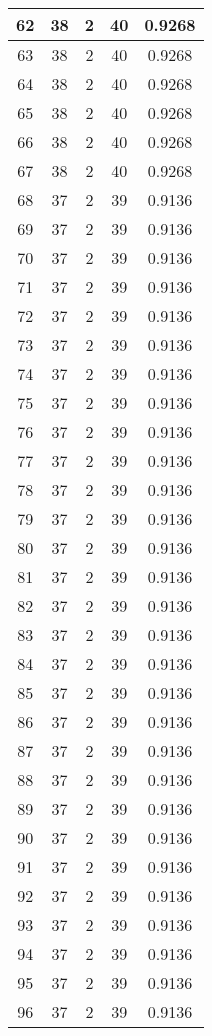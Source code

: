 \documentclass[letterpaper, 12pt]{article}
\begin{document}
\begin{longtable}{|c|c|c|c|c|}
\hline
62 & 38 & 2 & 40 & 0.9268 \\
\hline
63 & 38 & 2 & 40 & 0.9268 \\
\hline
64 & 38 & 2 & 40 & 0.9268 \\
\hline
65 & 38 & 2 & 40 & 0.9268 \\
\hline
66 & 38 & 2 & 40 & 0.9268 \\
\hline
67 & 38 & 2 & 40 & 0.9268 \\
\hline
68 & 37 & 2 & 39 & 0.9136 \\
\hline
69 & 37 & 2 & 39 & 0.9136 \\
\hline
70 & 37 & 2 & 39 & 0.9136 \\
\hline
71 & 37 & 2 & 39 & 0.9136 \\
\hline
72 & 37 & 2 & 39 & 0.9136 \\
\hline
73 & 37 & 2 & 39 & 0.9136 \\
\hline
74 & 37 & 2 & 39 & 0.9136 \\
\hline
75 & 37 & 2 & 39 & 0.9136 \\
\hline
76 & 37 & 2 & 39 & 0.9136 \\
\hline
77 & 37 & 2 & 39 & 0.9136 \\
\hline
78 & 37 & 2 & 39 & 0.9136 \\
\hline
79 & 37 & 2 & 39 & 0.9136 \\
\hline
80 & 37 & 2 & 39 & 0.9136 \\
\hline
81 & 37 & 2 & 39 & 0.9136 \\
\hline
82 & 37 & 2 & 39 & 0.9136 \\
\hline
83 & 37 & 2 & 39 & 0.9136 \\
\hline
84 & 37 & 2 & 39 & 0.9136 \\
\hline
85 & 37 & 2 & 39 & 0.9136 \\
\hline
86 & 37 & 2 & 39 & 0.9136 \\
\hline
87 & 37 & 2 & 39 & 0.9136 \\
\hline
88 & 37 & 2 & 39 & 0.9136 \\
\hline
89 & 37 & 2 & 39 & 0.9136 \\
\hline
90 & 37 & 2 & 39 & 0.9136 \\
\hline
91 & 37 & 2 & 39 & 0.9136 \\
\hline
92 & 37 & 2 & 39 & 0.9136 \\
\hline
93 & 37 & 2 & 39 & 0.9136 \\
\hline
94 & 37 & 2 & 39 & 0.9136 \\
\hline
95 & 37 & 2 & 39 & 0.9136 \\
\hline
96 & 37 & 2 & 39 & 0.9136 \\

\end{longtable}
\end{document}
